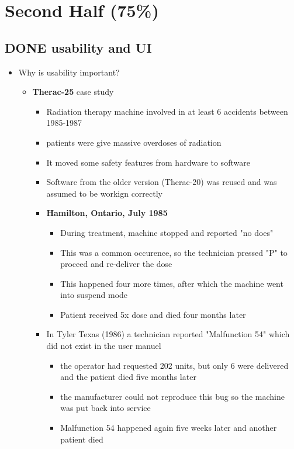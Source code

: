 \documentclass[11pt]{article}
\begin{document}
\section{Second Half (75\%)}
\label{sec-3}
\subsection{{\bfseries\sffamily DONE} usability and UI}
\label{sec-3-1}
\begin{itemize}
\item Why is usability important?
\begin{itemize}
\item \textbf{Therac-25} case study
\begin{itemize}
\item Radiation therapy machine involved in at least 6 accidents between 1985-1987
\item patients were give massive overdoses of radiation
\item It moved some safety features from hardware to software
\item Software from the older version (Therac-20) was reused and was assumed to be workign correctly
\item \textbf{Hamilton, Ontario, July 1985}
\begin{itemize}
\item During treatment, machine stopped and reported "no does"
\item This was a common occurence, so the technician pressed "P" to proceed and re-deliver the dose
\item This happened four more times, after which the machine went into suspend mode
\item Patient received 5x dose and died four months later
\end{itemize}
\item In Tyler Texas (1986) a technician reported "Malfunction 54" which did not exist in the user manuel
\begin{itemize}
\item the operator had requested 202 units, but only 6 were delivered and the patient died five months later
\item the manufacturer could not reproduce this bug so the machine was put back into service
\item Malfunction 54 happened again five weeks later and another patient died
\end{itemize}
\end{itemize}
\end{itemize}

\end{itemize}
\end{document}
